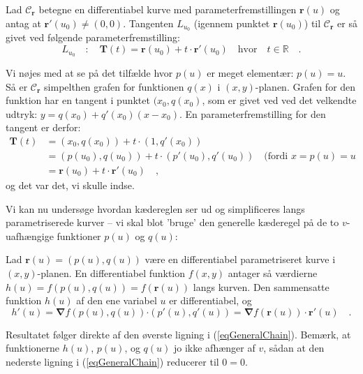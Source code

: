 \begin{theorem}
Lad $\mathcal{C}_{\mathbf{r}}$ betegne en differentiabel kurve med parameterfremstillingen $\mathbf{r}(u)$ og antag at $\mathbf{r}'(u_{0}) \neq (0, 0)$.
Tangenten $L_{u_{0}}$ (igennem punktet $\mathbf{r}(u_{0})$) til  $\mathcal{C}_{\mathbf{r}}$ er så givet ved følgende parameterfremstilling:
\begin{equation}
L_{u_{0}}\quad : \quad \mathbf{T}(t) =  \mathbf{r}(u_{0}) + t \cdot \mathbf{r}'(u_{0}) \quad \textrm{hvor} \quad t \in \mathbb{R} \quad.
\end{equation}
\end{theorem}
\begin{bevis}
Vi nøjes med at se på det tilfælde hvor $p(u)$ er meget elementær: $p(u) = u$. Så er $\mathcal{C}_{\mathbf{r}}$ simpelthen grafen for funktionen $q(x)$ i $(x,y)$-planen. Grafen for den funktion har en tangent i punktet $(x_{0}, q(x_{0})$, som er givet ved ved det velkendte udtryk: $y = q(x_{0}) + q'(x_{0})(x-x_{0})$. En parameterfremstilling for den tangent er derfor:
\begin{equation}
\begin{aligned}
\mathbf{T}(t) &= (x_{0}, q(x_{0})) + t \cdot (1, q'(x_{0})) \\
&=  (p(u_{0}), q(u_{0})) +  t \cdot (p'(u_{0}), q'(u_{0})) \quad \textrm{(fordi $x = p(u) = u$} \\
&= \mathbf{r}(u_{0}) + t \cdot \mathbf{r}'(u_{0}) \quad,
\end{aligned}
\end{equation}
og det var det, vi skulle indse.
\end{bevis}

Vi kan nu undersøge hvordan kædereglen ser ud og simplificeres langs parametriserede kurver -- vi skal blot 'bruge' den generelle kæderegel på de to $v$-uafhængige funktioner $p(u)$ og $q(u)$:

\begin{theorem} \label{thmKurveChainrule}
Lad $\mathbf{r}(u) = (p(u), q(u))$ være en differentiabel parametriseret kurve i $(x,y)$-planen. En differentiabel funktion $f(x,y)$ antager så værdierne  $h(u) = f(p(u), q(u)) = f(\mathbf{r}(u))$ langs kurven. Den sammensatte funktion $h(u)$ af den ene variabel $u$ er differentiabel, og
\begin{equation} \label{eqKurveChain}
h'(u) = {\bm{\nabla}}f(p(u), q(u)) {\bm{\cdot}} (p'(u), q'(u) ) = {\bm{\nabla}}f(\mathbf{r}(u))\, {\bm{\cdot}} \,{\mathbf{r}}'(u)\quad .
\end{equation}
\end{theorem}
\begin{bevis}
Resultatet følger direkte af den øverste ligning i (\ref{eqGeneralChain}). Bemærk, at funktionerne $h(u)$, $p(u)$, og $q(u)$ jo ikke afhænger af $v$, sådan at den nederste ligning i (\ref{eqGeneralChain}) reducerer til $0 = 0$.
\end{bevis}


